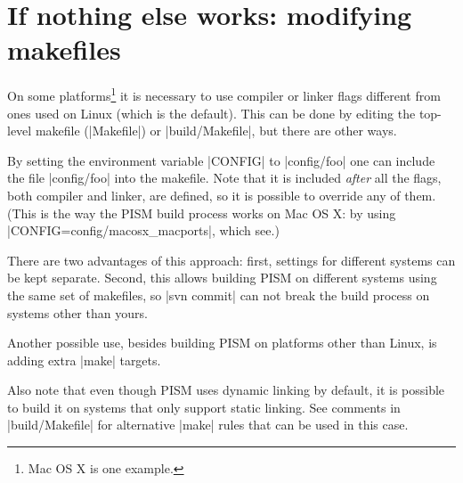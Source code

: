\documentclass[11pt,final]{amsart}
\begin{document}
\clearpage
\section{If nothing else works: modifying makefiles}
\label{sec:config}

On some platforms\footnote{Mac OS X is one example.} it is necessary to use compiler or linker flags different from ones used on
Linux (which is the default). This can be done by editing the top-level makefile (|Makefile|) or |build/Makefile|, but there are
other ways.

By setting the environment variable |CONFIG| to |config/foo| one can include the file |config/foo| into the makefile.
Note that it is included \emph{after} all the flags, both compiler and linker, are defined, so it is possible to override any of
them. (This is the way the PISM build process works on Mac OS X: by using |CONFIG=config/macosx_macports|, which see.)

There are two advantages of this approach: first, settings for different systems can be kept separate. Second, this allows
building PISM on different systems using the same set of makefiles, so |svn commit| can not break the build process on systems
other than yours.

Another possible use, besides building PISM on platforms other than Linux, is adding extra |make| targets.

Also note that even though PISM uses dynamic linking by default, it is possible to build it on systems that only support
static linking. See comments in |build/Makefile| for alternative |make| rules that can be used in this case. 

\clearpage
\end{document}
